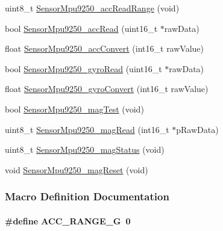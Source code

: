 \begin{DoxyCompactItemize}
\item 
uint8\+\_\+t \hyperlink{_sensor_mpu9250_8h_a7cced230a6a897c757fca032e7219be4}{Sensor\+Mpu9250\+\_\+acc\+Read\+Range} (void)
\item 
bool \hyperlink{_sensor_mpu9250_8h_abae57bd70cabd2a183ce98b5ace2d329}{Sensor\+Mpu9250\+\_\+acc\+Read} (uint16\+\_\+t $\ast$raw\+Data)
\item 
float \hyperlink{_sensor_mpu9250_8h_a3d866ff1aea56c827b1de59ea8a54d8d}{Sensor\+Mpu9250\+\_\+acc\+Convert} (int16\+\_\+t raw\+Value)
\item 
bool \hyperlink{_sensor_mpu9250_8h_ae9fa3abb44ca267374b96f2a218e90ad}{Sensor\+Mpu9250\+\_\+gyro\+Read} (uint16\+\_\+t $\ast$raw\+Data)
\item 
float \hyperlink{_sensor_mpu9250_8h_aa7c6327fc0848e156cef6f4350b286fa}{Sensor\+Mpu9250\+\_\+gyro\+Convert} (int16\+\_\+t raw\+Value)
\item 
bool \hyperlink{_sensor_mpu9250_8h_a8804081ccd27489dd7173c82f408ea38}{Sensor\+Mpu9250\+\_\+mag\+Test} (void)
\item 
uint8\+\_\+t \hyperlink{_sensor_mpu9250_8h_a593aab760dd24e57010d7bf7fc6d2a03}{Sensor\+Mpu9250\+\_\+mag\+Read} (int16\+\_\+t $\ast$p\+Raw\+Data)
\item 
uint8\+\_\+t \hyperlink{_sensor_mpu9250_8h_a7455703e28b77dbbc0dc659facf5e4b7}{Sensor\+Mpu9250\+\_\+mag\+Status} (void)
\item 
void \hyperlink{_sensor_mpu9250_8h_aa6f9928bfd3d77c9ea318adac3999bc7}{Sensor\+Mpu9250\+\_\+mag\+Reset} (void)
\end{DoxyCompactItemize}


\subsubsection{Macro Definition Documentation}
\paragraph[{A\+C\+C\+\_\+\+R\+A\+N\+G\+E\+\_\+2\+G}]{\setlength{\rightskip}{0pt plus 5cm}\#define A\+C\+C\+\_\+\+R\+A\+N\+G\+E\+\_\+G~0}\label{_sensor_mpu9250_8h_abc4ef02068eeab8d7749cdd74f51ad6e}
